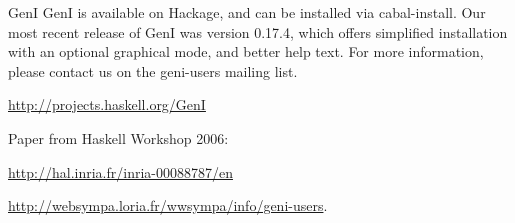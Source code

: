 \begin{hcarentry}[updated]{GenI}
GenI is available on Hackage, and can be installed via cabal-install.
Our most recent release of GenI was version 0.17.4, which offers
simplified installation with an optional graphical mode, and better help
text. For more information, please contact us on the geni-users mailing
list.

\FurtherReading
\begin{compactitem}
\item \url{http://projects.haskell.org/GenI}
\item Paper from Haskell Workshop 2006:

\url{http://hal.inria.fr/inria-00088787/en}
\item \url{http://websympa.loria.fr/wwsympa/info/geni-users}.
\end{compactitem}
\end{hcarentry}
